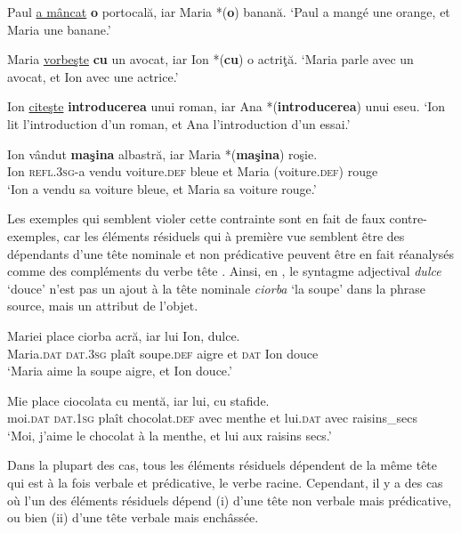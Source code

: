 \ea
\ea Paul \uline{a mâncat} \textbf{o} portocală, iar Maria *(\textbf{o}) banană. \label{ch2:ex119a}
\glt  ‘Paul a mangé une orange, et Maria une banane.’   

\ex  Maria \uline{vorbeşte} \textbf{cu} un avocat, iar Ion *(\textbf{cu}) o actriţă. \label{ch2:ex119b}
\glt  ‘Maria parle avec un avocat, et Ion avec une actrice.’       

\ex  Ion \uline{citeşte} \textbf{introducerea} unui roman, iar Ana *(\textbf{introducerea}) unui eseu. \label{ch2:ex119c}
\glt  ‘Ion lit l’introduction d’un roman, et Ana l’introduction d’un essai.’     

\ex 
\gll Ion    vândut  \textbf{maşina}  albastră,  iar  Maria  *(\textbf{maşina})  roşie. \label{ch2:ex119d}\\
Ion  \textsc{refl.3sg}-a  vendu  voiture.\textsc{def}  bleue  et  Maria  (voiture.\textsc{def})  rouge\\
\glt  ‘Ion a vendu sa voiture bleue, et Maria sa voiture rouge.’ 
\z
\z

Les exemples qui semblent violer cette contrainte sont en fait de faux contre-exemples, car les éléments résiduels qui à première vue semblent être des dépendants d’une tête nominale et non prédicative peuvent être en fait réanalysés comme des compléments du verbe tête . Ainsi, en , le syntagme adjectival \textit{dulce} ‘douce’ n’est pas un ajout à la tête nominale \textit{ciorba} ‘la soupe’ dans la phrase source, mais un attribut de l’objet.

\ea \label{ch2:ex120}
\ea 
\gll Mariei  place ciorba acră, iar lui Ion, dulce. \label{ch2:ex120a}\\
Maria.\textsc{dat} \textsc{dat.3sg} plaît soupe.\textsc{def} aigre et \textsc{dat} Ion douce\\
\glt ‘Maria aime la soupe aigre, et Ion douce.’ 

\ex 
\gll Mie    place  ciocolata  cu  mentă,  iar  lui,  cu  stafide.\\
moi\textsc{.dat}  \textsc{dat.1sg} plaît  chocolat.\textsc{def}  avec  menthe  et  lui.\textsc{dat}  avec  raisins\_secs\\
\glt  ‘Moi, j’aime le chocolat à la menthe, et lui aux raisins secs.’
\z
\z

Dans la plupart des cas, tous les éléments résiduels dépendent de la même tête qui est à la fois verbale et prédicative, {\cad} le verbe racine. Cependant, il y a des cas où l’un des éléments résiduels dépend (i) d’une tête non verbale mais prédicative, ou bien (ii) d’une tête verbale mais enchâssée. 

